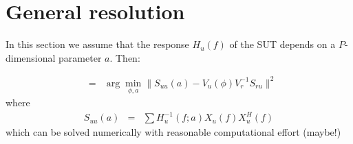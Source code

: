 \documentclass[a4paper, 12pt]{report}
\begin{document}
\section{General resolution}
In this section we assume that the response $H_{u}(f)$ of the SUT depends on a $P$-dimensional parameter $a$.  Then:

\begin{eqnarray*}
[\hat \phi, \hat a] &=& \arg\min_{\phi, a} \|S_{uu}(a) - V_{u}(\phi)V_{r}^{-1}S_{ru}\|^{2}
\end{eqnarray*}
where 
\begin{eqnarray*}
S_{uu}(a) &=&
\sum H_{u}^{-1}(f;a)X_{u}(f)X_{u}^{H}(f)
\end{eqnarray*}
which can be solved numerically with reasonable computational effort (maybe!)
\end{document}
